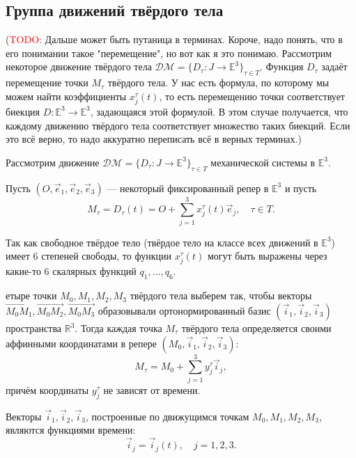 \documentclass{article}
\theoremstyle{definition}
\theoremstyle{plain}
\theoremstyle{remark}
\numberwithin{equation}{section}
\newcommand{\vv}[1]{\overrightarrow{#1}}
\begin{document}
\subsection{Группа движений твёрдого тела}

(\textcolor{red}{TODO:} Дальше может быть путаница в терминах. Короче, надо
понять, что в его понимании такое "перемещение", но вот как я это понимаю.
Рассмотрим некоторое движение твёрдого тела $\mathcal{DM} = \{ D_\tau : J \to
\mathbb{E}^3 \}_{\tau \in T}$. Функция $D_\tau$ задаёт перемещение точки
$M_\tau$ твёрдого тела. У нас есть формула, по которому мы можем найти
коэффициенты $x_j^\tau(t)$, то есть перемещению точки соответствует биекция
$D : \mathbb{E}^3 \to \mathbb{E}^3$, задающаяся этой формулой. В этом случае
получается, что каждому движению твёрдого тела соответствует множество таких
биекций. Если это всё верно, то надо аккуратно переписать всё в верных
терминах.)

Рассмотрим движение $\mathcal{DM} = \{ D_\tau : J \to \mathbb{E}^3 \}_{\tau \in
T}$ механической системы в $\mathbb{E}^3$.

Пусть $(O, \vec{e}_1, \vec{e}_2, \vec{e}_3)$ --- некоторый фиксированный репер в
$\mathbb{E}^3$ и пусть
\begin{equation}
  \label{eq:coords_in_immovable_frame}
  M_\tau = D_\tau(t) = O + \sum_{j=1}^{3} x_j^\tau(t) \vec{e}_j, \quad
    \tau \in T.
\end{equation}

Так как свободное твёрдое тело (твёрдое тело на классе всех движений в
$\mathbb{E}^3$) имеет 6 степеней свободы, то функции $x_j^\tau(t)$ могут быть
выражены через какие-то 6 скалярных функций $q_1, \dots, q_6$.

етыре точки $M_0, M_1, M_2, M_3$ твёрдого тела выберем так, чтобы векторы
$\vv{M_0 M_1}, \vv{M_0 M_2}, \vv{M_0 M_3}$ образовывали ортонормированный базис
$(\vec{i}_1, \vec{i}_2, \vec{i}_3)$ пространства $\mathbb{R}^3$. Тогда каждая
точка $M_\tau$ твёрдого тела определяется своими аффинными координатами в репере
$(M_0, \vec{i}_1, \vec{i}_2, \vec{i}_3)$:
\begin{equation}
  \label{eq:coords_in_movable_frame}
  M_\tau = M_0 + \sum_{j=1}^{3} y_j^\tau \vec{i}_j,
\end{equation}
причём координаты $y_j^\tau$ не зависят от времени.

Векторы $\vec{i}_1, \vec{i}_2, \vec{i}_3$, построенные по движущимся точкам
$M_0, M_1, M_2, M_3$, являются функциями времени:
\begin{equation*}
  \vec{i}_j = \vec{i}_j(t), \quad j = 1,2,3.
\end{equation*}
\end{document}
